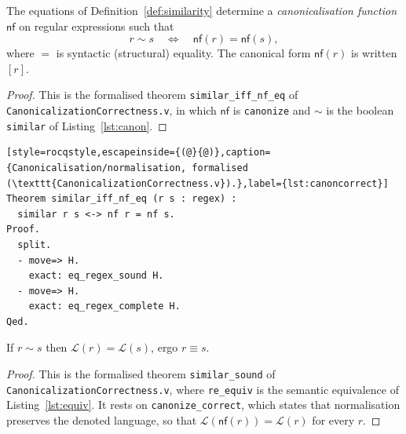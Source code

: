 \begin{lemma}\label{def:canonize}
The equations of Definition~\ref{def:similarity} determine a
\emph{canonicalisation function} $\mathsf{nf}$ on regular expressions such that
\[
  r \sim s \quad\Longleftrightarrow\quad \mathsf{nf}(r)=\mathsf{nf}(s),
\]
where $=$ is syntactic (structural) equality. The canonical form $\mathsf{nf}(r)$ is
written $[r]$.
\end{lemma}

\begin{proof}
This is the formalised theorem \texttt{similar\_iff\_nf\_eq} of
\texttt{CanonicalizationCorrectness.v}, in which $\mathsf{nf}$ is \texttt{canonize}
and $\sim$ is the boolean \texttt{similar} of Listing~\ref{lst:canon}.
\end{proof}

\begin{lstlisting}[style=rocqstyle,escapeinside={(@}{@)},caption={Canonicalisation/normalisation, formalised (\texttt{CanonicalizationCorrectness.v}).},label={lst:canoncorrect}]
Theorem similar_iff_nf_eq (r s : regex) :
  similar r s <-> nf r = nf s.
Proof.
  split.
  - move=> H.
    exact: eq_regex_sound H.
  - move=> H.
    exact: eq_regex_complete H.
Qed.
\end{lstlisting}

\begin{lemma}\label{lem:similarity-sound}
If $r \sim s$ then $\mathcal{L}(r)=\mathcal{L}(s)$, ergo $r \equiv s$.
\end{lemma}

\begin{proof}
This is the formalised theorem \texttt{similar\_sound} of
\texttt{CanonicalizationCorrectness.v}, where \texttt{re\_equiv} is the semantic
equivalence of Listing~\ref{lst:equiv}. It rests on \texttt{canonize\_correct},
which states that normalisation preserves the denoted language, so that
$\mathcal{L}(\mathsf{nf}(r))=\mathcal{L}(r)$ for every $r$.
\end{proof}

